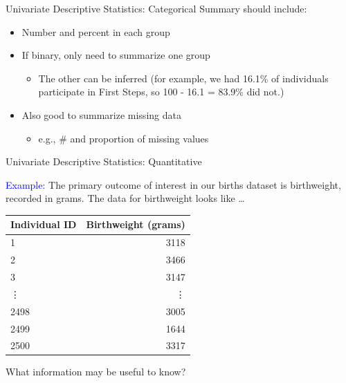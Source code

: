 \documentclass[10pt,t]{beamer}
\begin{document}
\begin{frame}{Univariate Descriptive Statistics: Categorical}
Summary should include:

\vspace{0.3cm}

\begin{itemize}
	\item Number and percent in each group
	\item If binary, only need to summarize one group
	\begin{itemize}
		\item The other can be inferred (for example, we had 16.1\% of individuals participate in First Steps, so 100 - 16.1 = 83.9\% did not.)
	\end{itemize}
	\item Also good to summarize missing data
	\begin{itemize}
		\item e.g., \# and proportion of missing values
	\end{itemize}
\end{itemize}	
\end{frame}

\begin{frame}{Univariate Descriptive Statistics: Quantitative}

\textcolor{blue}{Example:} The primary outcome of interest in our births dataset is birthweight, recorded in grams. The data for birthweight looks like \dots

\vspace{0.3cm}

\begin{table}
	\centering
	\begin{tabular}{l|r}
		\textbf{Individual ID} & \textbf{Birthweight (grams)} \\
		\hline
		1 & 3118\\
		\hline
		2 & 3466\\
		\hline
		3 & 3147 \\
		\hline 
		\vdots & \vdots \\
		\hline
		2498 & 3005 \\
		\hline 
		2499 & 1644 \\
		2500 & 3317
	\end{tabular}
\end{table}

\vspace{0.3cm}

What information may be useful to know?

\end{frame}
\end{document}
